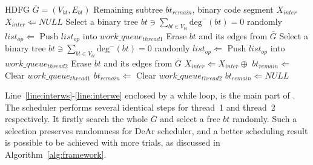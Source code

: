 \begin{algorithm}[ht!]
    \caption{}
    \begin{algorithmic}[1]
        \Require    HDFG $\bar{G} = (V_{bt}, E_{bt})$
        \Ensure     Remaining subtree $bt_{remain}$, binary code segment $X_{inter}$
        \State $X_{inter} \Leftarrow NULL$       
         \label{line:interws}
                \State Select a binary tree $bt \ni \sum_{bt \in V_{bt}}\textrm{deg}^-(bt) = 0$ randomly
                \State $list_{op} \Leftarrow$ 
                \State Push $list_{op}$ into $work\_queue_{thread1}$
                \State Erase $bt$ and its edges from $\bar{G}$
            \EndIf
                \State Select a binary tree $bt \ni \sum_{bt \in V_{bt}}\textrm{deg}^-(bt) = 0$ randomly
                \State $list_{op} \Leftarrow$ 
                \State Push $list_{op}$ into $work\_queue_{thread2}$
                \State Erase $bt$ and its edges from $\bar{G}$
            \EndIf
            \State $X_{inter} \Leftarrow X_{inter} \oplus$  \label{line:intercon}
        \EndWhile \label{line:interwe}
         \label{line:interis}
            \State $bt_{remain} \Leftarrow$ 
            \State Clear $work\_queue_{thread1}$
            \State $bt_{remain} \Leftarrow$ 
            \State Clear $work\_queue_{thread2}$
        \Else
            \State $bt_{remain} \Leftarrow NULL$
        \EndIf \label{line:interie}
        \State {}
    \end{algorithmic}
    \label{alg:inter}
\end{algorithm}
        Line~\ref{line:interws}-\ref{line:interwe} enclosed by a while loop, is the main part of .
        The scheduler performs several identical steps for thread~1 and thread~2 respectively.
        It firstly search the whole $\bar{G}$ and select a free $bt$ randomly.
        Such a selection preserves randomness for DeAr scheduler, 
        and a better scheduling result is possible to be achieved with more trials, as discussed in Algorithm~\ref{alg:framework}.
